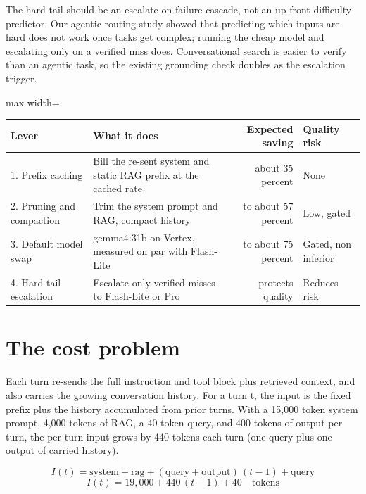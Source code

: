 \documentclass[11pt]{uce-report}
\begin{document}
\begin{uceokbox}The hard tail should be an escalate on failure cascade, not an up front difficulty predictor. Our agentic routing study showed that predicting which inputs are hard does not work once tasks get complex; running the cheap model and escalating only on a verified miss does. Conversational search is easier to verify than an agentic task, so the existing grounding check doubles as the escalation trigger.

\end{uceokbox}
\vspace{0.4em}
\noindent\begin{adjustbox}{max width=\linewidth}\begin{tabular}{lp{6.2cm}rl}
\toprule
\textbf{Lever} & \textbf{What it does} & \textbf{Expected saving} & \textbf{Quality risk} \\
\midrule
1. Prefix caching & Bill the re-sent system and static RAG prefix at the cached rate & about 35 percent & None \\
2. Pruning and compaction & Trim the system prompt and RAG, compact history & to about 57 percent & Low, gated \\
3. Default model swap & gemma4:31b on Vertex, measured on par with Flash-Lite & to about 75 percent & Gated, non inferior \\
4. Hard tail escalation & Escalate only verified misses to Flash-Lite or Pro & protects quality & Reduces risk \\
\bottomrule
\end{tabular}\end{adjustbox}

\section{The cost problem}
Each turn re-sends the full instruction and tool block plus retrieved context, and also carries the growing conversation history. For a turn t, the input is the fixed prefix plus the history accumulated from prior turns. With a 15,000 token system prompt, 4,000 tokens of RAG, a 40 token query, and 400 tokens of output per turn, the per turn input grows by 440 tokens each turn (one query plus one output of carried history).


\[I(t) = \text{system} + \text{rag} + (\text{query} + \text{output})\,(t-1) + \text{query}\]
\[I(t) = 19{,}000 + 440\,(t-1) + 40 \quad\text{tokens}\]
\end{document}
